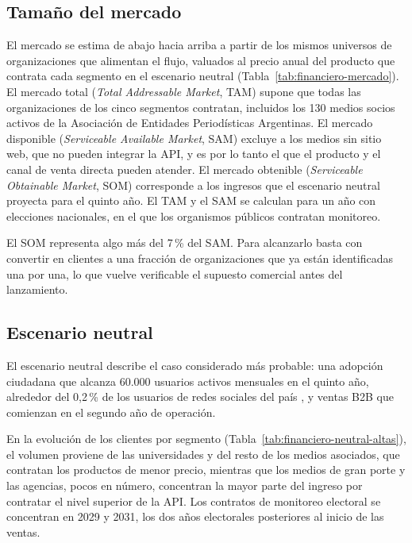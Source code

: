 \subsection{Tamaño del mercado}

El mercado se estima de abajo hacia arriba a partir de los mismos universos de organizaciones que alimentan el flujo, valuados al precio anual del producto que contrata cada segmento en el escenario neutral (Tabla~\ref{tab:financiero-mercado}). El mercado total (\textit{Total Addressable Market}, TAM) supone que todas las organizaciones de los cinco segmentos contratan, incluidos los 130 medios socios activos de la Asociación de Entidades Periodísticas Argentinas. El mercado disponible (\textit{Serviceable Available Market}, SAM) excluye a los medios sin sitio web, que no pueden integrar la API, y es por lo tanto el que el producto y el canal de venta directa pueden atender. El mercado obtenible (\textit{Serviceable Obtainable Market}, SOM) corresponde a los ingresos que el escenario neutral proyecta para el quinto año. El TAM y el SAM se calculan para un año con elecciones nacionales, en el que los organismos públicos contratan monitoreo.



El SOM representa algo más del 7\,\% del SAM. Para alcanzarlo basta con convertir en clientes a una fracción de organizaciones que ya están identificadas una por una, lo que vuelve verificable el supuesto comercial antes del lanzamiento.

\subsection{Escenario neutral}

El escenario neutral describe el caso considerado más probable: una adopción ciudadana que alcanza 60.000 usuarios activos mensuales en el quinto año, alrededor del 0,2\,\% de los usuarios de redes sociales del país \parencite{DataReportal2024}, y ventas B2B que comienzan en el segundo año de operación.

En la evolución de los clientes por segmento (Tabla~\ref{tab:financiero-neutral-altas}), el volumen proviene de las universidades y del resto de los medios asociados, que contratan los productos de menor precio, mientras que los medios de gran porte y las agencias, pocos en número, concentran la mayor parte del ingreso por contratar el nivel superior de la API. Los contratos de monitoreo electoral se concentran en 2029 y 2031, los dos años electorales posteriores al inicio de las ventas.


